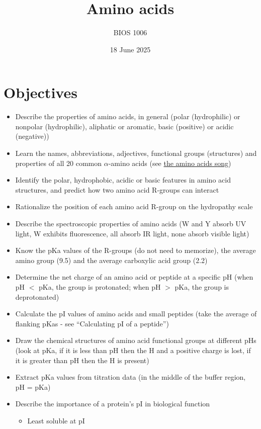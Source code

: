 \documentclass[letterpaper, 12pt]{article}
\title{Amino acids}
\author{BIOS 1006}
\date{18 June 2025}
\begin{document}
\maketitle

\section*{Objectives}

\begin{itemize}
\item Describe the properties of amino acids, in general (polar (hydrophilic) or nonpolar (hydrophilic), aliphatic or aromatic, basic (positive) or acidic (negative))
\item Learn the names, abbreviations, adjectives, functional groups (structures) and properties of all 20 common $\alpha$-amino acids (see \href{https://www.youtube.com/watch?v=BCAUaYpbHwY}{the amino acids song})
\item Identify the polar, hydrophobic, acidic or basic features in amino acid structures, and predict how two amino acid R-groups can interact
\item Rationalize the position of each amino acid R-group on the hydropathy scale
\item Describe the spectroscopic properties of amino acids (W and Y absorb UV light, W exhibits fluorescence, all absorb IR light, none absorb visible light)
\item Know the pKa values of the R-groups (do not need to memorize), the average amino group (9.5) and the average carboxylic acid group (2.2)
\item Determine the net charge of an amino acid or peptide at a specific pH (when pH $<$ pKa, the group is protonated; when pH $>$ pKa, the group is deprotonated)
\item Calculate the pI values of amino acids and small peptides (take the average of flanking pKas - see ``Calculating pI of a peptide'')
\item Draw the chemical structures of amino acid functional groups at different pHs (look at pKa, if it is less than pH then the H and a positive charge is lost, if it is greater than pH then the H is present)
\item Extract pKa values from titration data (in the middle of the buffer region, pH = pKa)
\item Describe the importance of a protein’s pI in biological function
\begin{itemize}
\item Least soluble at pI

\end{itemize}
\end{itemize}
\end{document}
